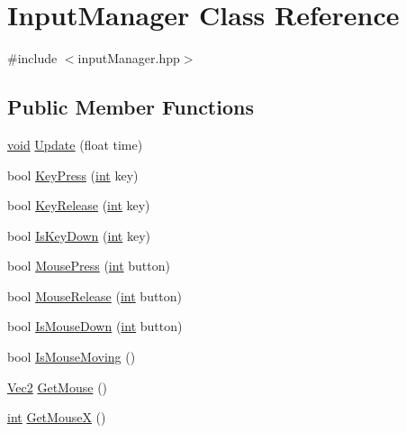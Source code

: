 \hypertarget{class_input_manager}{\section{Input\-Manager Class Reference}
\label{class_input_manager}
}


{\ttfamily \#include $<$input\-Manager.\-hpp$>$}

\subsection*{Public Member Functions}
\begin{DoxyCompactItemize}
\item 
\hyperlink{_s_d_l__opengles2__gl2ext_8h_ae5d8fa23ad07c48bb609509eae494c95}{void} \hyperlink{class_input_manager_ac600b79cd7d00891c01dc7c2bf3cdd4a}{Update} (float time)
\item 
bool \hyperlink{class_input_manager_a57c892ec4aefb2f865c9613b51402821}{Key\-Press} (\hyperlink{_s_d_l__thread_8h_a6a64f9be4433e4de6e2f2f548cf3c08e}{int} key)
\item 
bool \hyperlink{class_input_manager_a68008d78dbe65349a63a6cf0baf742e9}{Key\-Release} (\hyperlink{_s_d_l__thread_8h_a6a64f9be4433e4de6e2f2f548cf3c08e}{int} key)
\item 
bool \hyperlink{class_input_manager_a8d4924e8cd6106d529a41be7cd5f0feb}{Is\-Key\-Down} (\hyperlink{_s_d_l__thread_8h_a6a64f9be4433e4de6e2f2f548cf3c08e}{int} key)
\item 
bool \hyperlink{class_input_manager_a3da83876797fc9d370283452f13423d2}{Mouse\-Press} (\hyperlink{_s_d_l__thread_8h_a6a64f9be4433e4de6e2f2f548cf3c08e}{int} button)
\item 
bool \hyperlink{class_input_manager_a2fc15e37edebfa0bcec4d2b9914c363a}{Mouse\-Release} (\hyperlink{_s_d_l__thread_8h_a6a64f9be4433e4de6e2f2f548cf3c08e}{int} button)
\item 
bool \hyperlink{class_input_manager_aa4637f1a4ebdb26e51a91e2d9ec19ea0}{Is\-Mouse\-Down} (\hyperlink{_s_d_l__thread_8h_a6a64f9be4433e4de6e2f2f548cf3c08e}{int} button)
\item 
bool \hyperlink{class_input_manager_a7d3de04b6adc77e8e38c10faf14594a3}{Is\-Mouse\-Moving} ()
\item 
\hyperlink{class_vec2}{Vec2} \hyperlink{class_input_manager_aaa94e3be96fbbd44067473741c9febcf}{Get\-Mouse} ()
\item 
\hyperlink{_s_d_l__thread_8h_a6a64f9be4433e4de6e2f2f548cf3c08e}{int} \hyperlink{class_input_manager_af9bde9886eebfed884ade36fdc85337e}{Get\-Mouse\-X} ()

\end{DoxyCompactItemize}
